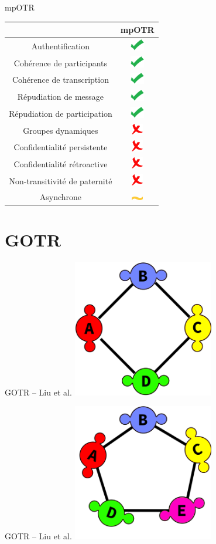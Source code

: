 \documentclass{beamer}
\newcommand{\okay}{\includegraphics[height=0.5cm]{img/check.png}}
\newcommand{\nope}{\includegraphics[height=0.5cm]{img/cross.png}}
\newcommand{\sortof}{\includegraphics[width=0.5cm]{img/tilde.png}}
\begin{document}
\begin{frame}{mpOTR}
	\center
  	\begin{tabular}{c|c}
			                              & mpOTR  \\
			\hline
  		Authentification              & \okay  \\
  		\hline
  		Cohérence de participants     & \okay  \\
  		Cohérence de transcription    & \okay  \\
  		\hline
  		Répudiation de message        & \okay  \\
  		Répudiation de participation  & \okay  \\
  		\hline
  		Groupes dynamiques            & \nope  \\
  		\hline
  		Confidentialité persistente   & \nope  \\
  		Confidentialité rétroactive   & \nope  \\
  		Non-transitivité de paternité & \nope  \\
  		\hline
  		Asynchrone                    & \sortof
    \end{tabular}
\end{frame}


\section{GOTR}
\begin{frame}{GOTR -- Liu et al.\cite{gotr}}
	\center
	\includegraphics[height=6cm]{img/group_ring4.png}
\end{frame}

\begin{frame}{GOTR -- Liu et al.\cite{gotr}}
	\center
	\includegraphics[height=6cm]{img/group_ring5.png}
\end{frame}
\end{document}
